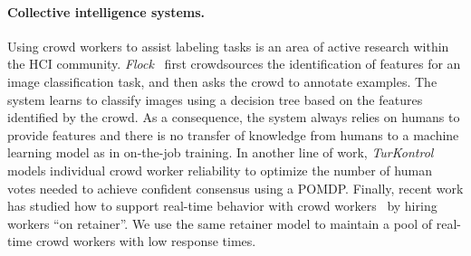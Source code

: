 \paragraph{Collective intelligence systems.}
Using crowd workers to assist labeling tasks is an area of active research within the HCI community.
\textit{Flock}~\citep{cheng2015flock} first crowdsources the identification of features for an image classification task, and then asks the crowd to annotate examples.
The system learns to classify images using a decision tree based on the features identified by the crowd.
As a consequence, the system always relies on humans to provide features and there is no transfer of knowledge from humans to a machine learning model as in on-the-job training.
In another line of work, \textit{TurKontrol}~\citep{dai2010decision} models individual crowd worker reliability to optimize the number of human votes needed to achieve confident consensus using a POMDP\@.
Finally, recent work has studied how to support real-time behavior with crowd workers~\citep{bernstein2011crowds,lasecki2013realtime} by hiring workers ``on retainer''.
We use the same retainer model to maintain a pool of real-time crowd workers with low response times.


